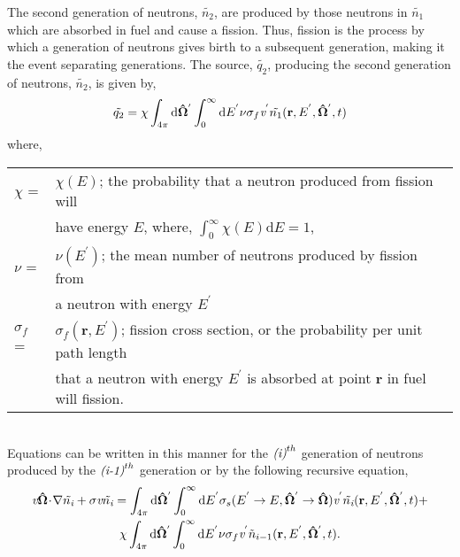 \noindent
	The second generation of neutrons, $\tilde{n_2}$, are produced by those neutrons in
	$\tilde{n_1}$ which are absorbed in fuel and cause a fission.  Thus, fission is the
	process by which a generation of neutrons gives birth to a subsequent generation, making
	it the event separating generations.  The source, $\tilde{q_2}$,
	producing the second generation of neutrons, $\tilde{n_2}$, is given by,
\begin{equation}
	\tilde{q_2} = \chi\int_{4\pi} \mathrm{d}\mathbf{\hat{\Omega}}^{'}\int_{0}^{\infty}
		\mathrm{d}{E}^{'} \nu{\sigma_f}
		\emph{v}^{'}\tilde{n_1}(\mathbf{r},{E}^{'},\mathbf{\hat{\Omega}}^{'},t)
	\label{eq:src-gen2}
\end{equation}
	where, \vspace{10pt} \\
	\begin{tabular}{ll}
		${\chi}$ \hfill = & ${\chi({E})}$; the probability that a neutron produced from fission
			will \\ & have energy ${E}$, where, ${\int_{0}^{\infty}{\chi}({E})\mathrm{d}{E}=1}$,
			\vspace{10pt} \\	
		${\nu}$ \hfill = & ${\nu({E}^{'})}$; the mean number of neutrons produced by fission
		from \\ & a neutron with energy ${E}^{'}$\vspace{10pt} \\
		${\sigma_f}$ \hfill = & ${\sigma_f(\mathbf{r},{E}^{'})}$; fission cross section, or the
		probability per unit path length \\ & that a neutron with energy ${E}^{'}$ is absorbed at point
		$\mathbf{r}$
		in fuel will fission.  \vspace{10pt} \\
	\end{tabular} \vspace{10pt} \\
	
\noindent
	Equations can be written in this manner for the ${\emph{(i)}^{th}}$ generation of neutrons
	produced by the ${\emph{(i-1)}^{th}}$ generation or by the following recursive equation,
\begin{multline}
	\emph{v}\mathbf{\hat{\Omega}} \!\cdot\! \mathbf{\nabla}\tilde{n_\emph{i}}
		 +\sigma \emph{v}{\tilde{n_\emph{i}}} = \int_{4\pi} \mathrm{d}\mathbf{\hat{\Omega}}^{'}
		 \int_{0}^{\infty}\mathrm{d}{E}^{'}\sigma_{s}({E}^{'}\rightarrow{E},
		 \mathbf{\hat{\Omega}}^{'}\rightarrow \mathbf{\hat{\Omega}})
		\emph{v}^{'}\tilde{n_\emph{i}}(\mathbf{r},{E}^{'},\mathbf{\hat{\Omega}}^{'},t) + \\
		 \chi\int_{4\pi} \mathrm{d}\mathbf{\hat{\Omega}}^{'}\int_{0}^{\infty}\mathrm{d}{E}^{'}
		 \nu{\sigma_f} \emph{v}^{'}{\tilde{n}_{i-1}}(\mathbf{r},{E}^{'},\mathbf{\hat{\Omega}}^{'},t).
	\label{eq:recurs}
\end{multline}

